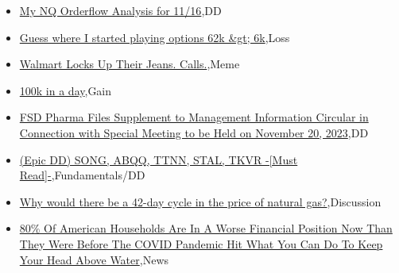 \documentclass{article}%
\begin{document}
%
\begin{itemize}%
\item%
\href{https://reddit.com/r/wallstreetbets/comments/17wgg64/my\_nq\_orderflow\_analysis\_for\_1116/}{My NQ Orderflow Analysis for 11/16},DD%
\item%
\href{https://reddit.com/r/wallstreetbets/comments/17weznv/guess\_where\_i\_started\_playing\_options\_62k\_6k/}{Guess where I started playing options 62k \&gt; 6k},Loss%
\item%
\href{https://reddit.com/r/wallstreetbets/comments/17weu8x/walmart\_locks\_up\_their\_jeans\_calls/}{Walmart Locks Up Their Jeans. Calls.},Meme%
\item%
\href{https://reddit.com/r/wallstreetbets/comments/17wdbmt/100k\_in\_a\_day/}{100k in a day},Gain%
\item%
\href{https://reddit.com/r/Baystreetbets/comments/17vv30n/fsd\_pharma\_files\_supplement\_to\_management/}{FSD Pharma Files Supplement to Management Information Circular in Connection with Special Meeting to be Held on November 20, 2023},DD%
\item%
\href{https://reddit.com/r/StockMarket/comments/17wh5na/epic\_dd\_song\_abqq\_ttnn\_stal\_tkvr\_must\_read/}{(Epic DD) SONG, ABQQ, TTNN, STAL, TKVR -[Must Read]-},Fundamentals/DD%
\item%
\href{https://reddit.com/r/StockMarket/comments/17vwfh3/why\_would\_there\_be\_a\_42day\_cycle\_in\_the\_price\_of/}{Why would there be a 42-day cycle in the price of natural gas?},Discussion%
\item%
\href{https://reddit.com/r/Economics/comments/17wkph5/80\_of\_american\_households\_are\_in\_a\_worse/}{80\% Of American Households Are In A Worse Financial Position Now Than They Were Before The COVID Pandemic Hit  What You Can Do To Keep Your Head Above Water},News%
\end{itemize}%
\end{document}
